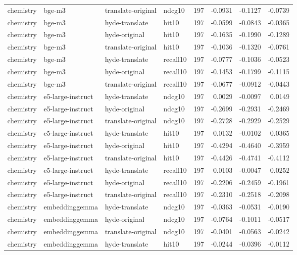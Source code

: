 \begin{tabular}{llllrrrr}
chemistry & bge-m3 & translate-original & ndcg10 & 197 & -0.0931 & -0.1127 & -0.0739 \\
chemistry & bge-m3 & hyde-translate & hit10 & 197 & -0.0599 & -0.0843 & -0.0365 \\
chemistry & bge-m3 & hyde-original & hit10 & 197 & -0.1635 & -0.1990 & -0.1289 \\
chemistry & bge-m3 & translate-original & hit10 & 197 & -0.1036 & -0.1320 & -0.0761 \\
chemistry & bge-m3 & hyde-translate & recall10 & 197 & -0.0777 & -0.1036 & -0.0523 \\
chemistry & bge-m3 & hyde-original & recall10 & 197 & -0.1453 & -0.1799 & -0.1115 \\
chemistry & bge-m3 & translate-original & recall10 & 197 & -0.0677 & -0.0912 & -0.0443 \\
chemistry & e5-large-instruct & hyde-translate & ndcg10 & 197 & 0.0029 & -0.0097 & 0.0149 \\
chemistry & e5-large-instruct & hyde-original & ndcg10 & 197 & -0.2699 & -0.2931 & -0.2469 \\
chemistry & e5-large-instruct & translate-original & ndcg10 & 197 & -0.2728 & -0.2929 & -0.2529 \\
chemistry & e5-large-instruct & hyde-translate & hit10 & 197 & 0.0132 & -0.0102 & 0.0365 \\
chemistry & e5-large-instruct & hyde-original & hit10 & 197 & -0.4294 & -0.4640 & -0.3959 \\
chemistry & e5-large-instruct & translate-original & hit10 & 197 & -0.4426 & -0.4741 & -0.4112 \\
chemistry & e5-large-instruct & hyde-translate & recall10 & 197 & 0.0103 & -0.0047 & 0.0252 \\
chemistry & e5-large-instruct & hyde-original & recall10 & 197 & -0.2206 & -0.2459 & -0.1961 \\
chemistry & e5-large-instruct & translate-original & recall10 & 197 & -0.2310 & -0.2518 & -0.2098 \\
chemistry & embeddinggemma & hyde-translate & ndcg10 & 197 & -0.0363 & -0.0531 & -0.0190 \\
chemistry & embeddinggemma & hyde-original & ndcg10 & 197 & -0.0764 & -0.1011 & -0.0517 \\
chemistry & embeddinggemma & translate-original & ndcg10 & 197 & -0.0401 & -0.0563 & -0.0242 \\
chemistry & embeddinggemma & hyde-translate & hit10 & 197 & -0.0244 & -0.0396 & -0.0112 \\

\end{tabular}
